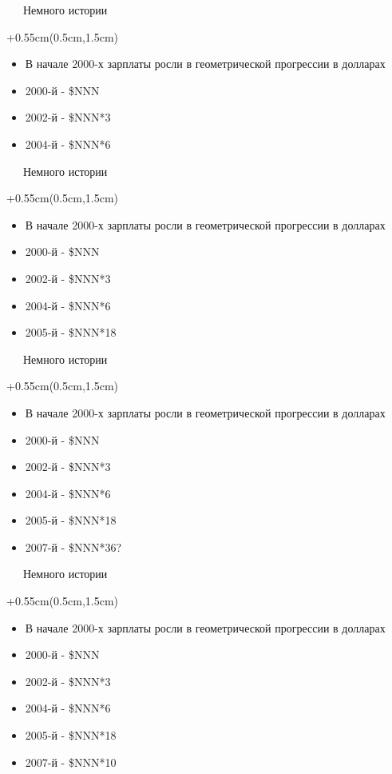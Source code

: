 \documentclass[xetex,18pt,aspectratio=169]{beamer}
\begin{document}
\begin{Large}
\begin{frame}{\ \ \ Немного истории}
\begin{textblock*}{\framewidth+0.55cm}(0.5cm,1.5cm)
\begin{itemize}
  \item В начале 2000-х зарплаты росли в геометрической прогрессии в долларах
  \item 2000-й - \$NNN
  \item 2002-й - \$NNN*3
  \item 2004-й - \$NNN*6
\end{itemize}
\end{textblock*}
\end{frame}

\begin{frame}{\ \ \ Немного истории}
\begin{textblock*}{\framewidth+0.55cm}(0.5cm,1.5cm)
\begin{itemize}
  \item В начале 2000-х зарплаты росли в геометрической прогрессии в долларах
  \item 2000-й - \$NNN
  \item 2002-й - \$NNN*3
  \item 2004-й - \$NNN*6
  \item 2005-й - \$NNN*18
\end{itemize}
\end{textblock*}
\end{frame}

\begin{frame}{\ \ \ Немного истории}
\begin{textblock*}{\framewidth+0.55cm}(0.5cm,1.5cm)
\begin{itemize}
  \item В начале 2000-х зарплаты росли в геометрической прогрессии в долларах
  \item 2000-й - \$NNN
  \item 2002-й - \$NNN*3
  \item 2004-й - \$NNN*6
  \item 2005-й - \$NNN*18
  \item 2007-й - \$NNN*36?
\end{itemize}
\end{textblock*}
\end{frame}

\begin{frame}{\ \ \ Немного истории}
\begin{textblock*}{\framewidth+0.55cm}(0.5cm,1.5cm)
\begin{itemize}
  \item В начале 2000-х зарплаты росли в геометрической прогрессии в долларах
  \item 2000-й - \$NNN
  \item 2002-й - \$NNN*3
  \item 2004-й - \$NNN*6
  \item 2005-й - \$NNN*18
  \item 2007-й - \$NNN*10
\end{itemize}
\end{textblock*}
\end{frame}


\end{Large}
\end{document}
